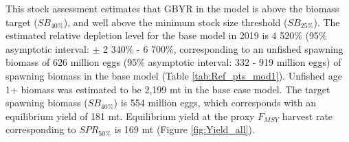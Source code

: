 \documentclass[12pt,]{article}
\begin{document}
This stock assessment estimates that GBYR in the model is above the
biomass target (\(SB_{40\%}\)), and well above the minimum stock size
threshold (\(SB_{25\%}\)). The estimated relative depletion level for
the base model in 2019 is 4 520\% (95\% asymptotic interval: \(\pm\) 2
340\% - 6 700\%, corresponding to an unfished spawning biomass of 626
million eggs (95\% asymptotic interval: 332 - 919 million eggs) of
spawning biomass in the base model (Table \ref{tab:Ref_pts_mod1}).
Unfished age 1+ biomass was estimated to be 2,199 mt in the base case
model. The target spawning biomass (\(SB_{40\%}\)) is 554 million eggs,
which corresponds with an equilibrium yield of 181 mt. Equilibrium yield
at the proxy \(F_{MSY}\) harvest rate corresponding to \(SPR_{50\%}\) is
169 mt (Figure \ref{fig:Yield_all}).

\FloatBarrier
\end{document}
